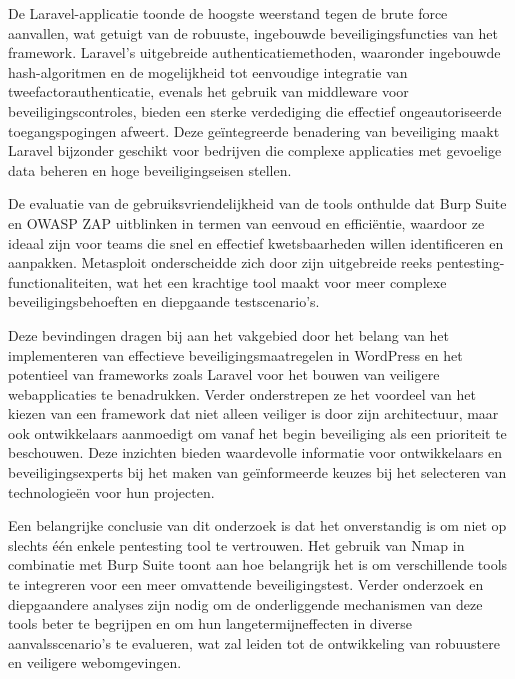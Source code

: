 De Laravel-applicatie toonde de hoogste weerstand tegen de brute force aanvallen, wat getuigt van de robuuste, 
ingebouwde beveiligingsfuncties van het framework. Laravel's uitgebreide authenticatiemethoden, waaronder ingebouwde 
hash-algoritmen en de mogelijkheid tot eenvoudige integratie van tweefactorauthenticatie, evenals het gebruik van 
middleware voor beveiligingscontroles, bieden een sterke verdediging die effectief ongeautoriseerde toegangspogingen 
afweert. Deze geïntegreerde benadering van beveiliging maakt Laravel bijzonder geschikt voor bedrijven die complexe 
applicaties met gevoelige data beheren en hoge beveiligingseisen stellen.

De evaluatie van de gebruiksvriendelijkheid van de tools onthulde dat Burp Suite en OWASP ZAP uitblinken in termen 
van eenvoud en efficiëntie, waardoor ze ideaal zijn voor teams die snel en effectief kwetsbaarheden willen identificeren 
en aanpakken. Metasploit onderscheidde zich door zijn uitgebreide reeks pentesting-functionaliteiten, wat het een 
krachtige tool maakt voor meer complexe beveiligingsbehoeften en diepgaande testscenario's.

Deze bevindingen dragen bij aan het vakgebied door het belang van het implementeren van effectieve beveiligingsmaatregelen 
in WordPress en het potentieel van frameworks zoals Laravel voor het bouwen van veiligere webapplicaties te benadrukken.
 Verder onderstrepen ze het voordeel van het kiezen van een framework dat niet alleen veiliger is door zijn architectuur,
  maar ook ontwikkelaars aanmoedigt om vanaf het begin beveiliging als een prioriteit te beschouwen. Deze inzichten bieden 
  waardevolle informatie voor ontwikkelaars en beveiligingsexperts bij het maken van geïnformeerde keuzes bij het 
  selecteren van technologieën voor hun projecten.

Een belangrijke conclusie van dit onderzoek is dat het onverstandig is om niet op slechts één enkele pentesting tool te 
vertrouwen. Het gebruik van Nmap in combinatie met Burp Suite toont aan hoe belangrijk het is om verschillende tools te 
integreren voor een meer omvattende beveiligingstest. Verder onderzoek en diepgaandere analyses zijn 
nodig om de onderliggende mechanismen van deze tools beter te begrijpen en om hun langetermijneffecten in diverse 
aanvalsscenario's te evalueren, wat zal leiden tot de ontwikkeling van robuustere en veiligere webomgevingen.